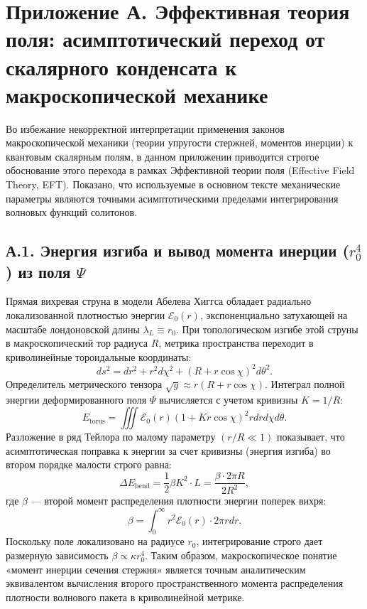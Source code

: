 \documentclass[11pt,a4paper]{article}
\begin{document}
\section*{Приложение А. Эффективная теория поля: асимптотический переход от скалярного конденсата к макроскопической механике}

Во избежание некорректной интерпретации применения законов макроскопической механики (теории упругости стержней, моментов инерции) к квантовым скалярным полям, в данном приложении приводится строгое обоснование этого перехода в рамках Эффективной теории поля (Effective Field Theory, EFT). Показано, что используемые в основном тексте механические параметры являются точными асимптотическими пределами интегрирования волновых функций солитонов.

\subsection*{А.1. Энергия изгиба и вывод момента инерции ($r_0^4$) из поля $\Psi$}
Прямая вихревая струна в модели Абелева Хиггса обладает радиально локализованной плотностью энергии $\mathcal{E}_0(r)$, экспоненциально затухающей на масштабе лондоновской длины $\lambda_L \equiv r_0$. При топологическом изгибе этой струны в макроскопический тор радиуса $R$, метрика пространства переходит в криволинейные тороидальные координаты:
\begin{equation}
ds^2 = dr^2 + r^2 d\chi^2 + (R + r\cos\chi)^2 d\theta^2.
\end{equation}
Определитель метрического тензора $\sqrt{g} \approx r(R + r\cos\chi)$. Интеграл полной энергии деформированного поля $\Psi$ вычисляется с учетом кривизны $K = 1/R$:
\begin{equation}
E_{\text{torus}} = \iiint \mathcal{E}_0(r) \left(1 + K r\cos\chi\right)^2 r dr d\chi d\theta.
\end{equation}
Разложение в ряд Тейлора по малому параметру $(r/R \ll 1)$ показывает, что асимптотическая поправка к энергии за счет кривизны (энергия изгиба) во втором порядке малости строго равна:
\begin{equation}
\Delta E_{\text{bend}} = \frac{1}{2} \beta K^2 \cdot L = \frac{\beta \cdot 2\pi R}{2 R^2},
\end{equation}
где $\beta$ — второй момент распределения плотности энергии поперек вихря:
\begin{equation}
\beta = \int_0^\infty r^2 \mathcal{E}_0(r) \cdot 2\pi r dr.
\end{equation}
Поскольку поле локализовано на радиусе $r_0$, интегрирование строго дает размерную зависимость $\beta \propto \kappa r_0^4$. Таким образом, макроскопическое понятие «момент инерции сечения стержня» является точным аналитическим эквивалентом вычисления второго пространственного момента распределения плотности волнового пакета в криволинейной метрике.
\end{document}
